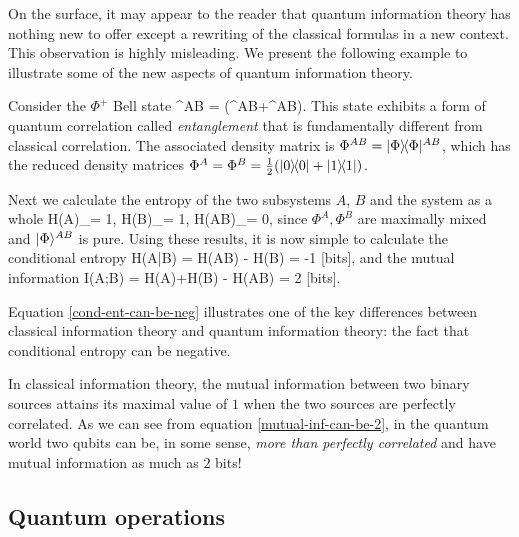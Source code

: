 \documentclass[aps,11pt,twoside,letterpaper]{article}
\theoremstyle{plain}
\theoremstyle{definition}
\begin{document}
			
			On the surface, it may appear to the reader that quantum information theory has nothing new to offer except 
			a rewriting of the classical formulas in a new context.
			This observation is highly misleading.
			We present the following example to illustrate some of the new aspects of quantum information theory.
			
			\begin{example}	\label{example:EPR-pair}
				Consider the $\Phi^{+}$\! Bell state 
				\be
					\ket{\Phi}^{AB} = (^{AB}+^{AB}).
				\ee
				This state exhibits a form of quantum correlation called \emph{entanglement} that is fundamentally
				different from classical correlation.
				The associated density matrix is $\Phi^{AB} = | \Phi \rangle\!\langle \Phi |^{AB}$, which has
				the reduced density matrices $\Phi^A = \Phi^B = \tfrac{1}{2}(| 0 \rangle\!\langle 0 | + | 1 \rangle\!\langle 1 |)$.
				
				Next we calculate the entropy of the two subsystems $A$, $B$ and the system as a whole 
				\be
					H(A)_\Phi = 1, 	\qquad
					H(B)_\Phi = 1, 	\qquad
					H(AB)_\Phi = 0,
				\ee
				since $\Phi^A,\Phi^B$ are maximally mixed and $| \Phi \rangle^{AB}$ is pure.
				Using these results, it is now simple to calculate the conditional entropy
				\be	\label{cond-ent-can-be-neg}
					H(A|B)	=	H(AB) - H(B)	= -1 \textup{ [bits]},
				\ee
				and the mutual information
				\be	\label{mutual-inf-can-be-2}
					I(A;B)	=	H(A)+H(B) - H(AB)	= 2 \textup{ [bits]}.
				\ee
			\end{example}
			
			Equation \eqref{cond-ent-can-be-neg} illustrates one of the key differences between classical information
			theory and quantum information theory: the fact that conditional entropy can be negative.
			
			In classical information theory, the mutual information between two binary sources attains its maximal value
			of $1$ when the two sources are perfectly correlated. As we can see from equation 
			\eqref{mutual-inf-can-be-2}, in the quantum world two qubits can be, in some sense,
			\emph{more than perfectly correlated} and have mutual information as much as $2$ bits!
			

		\subsection{Quantum operations}	
\end{document}
